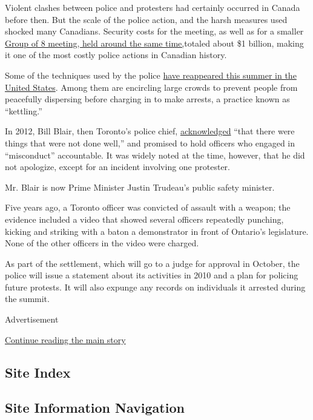 Violent clashes between police and protesters had certainly occurred in
Canada before then. But the scale of the police action, and the harsh
measures used shocked many Canadians. Security costs for the meeting, as
well as for a smaller
\href{https://www.nytimes3xbfgragh.onion/2010/06/25/world/americas/25canada.html}{Group
of 8 meeting, held around the same time,}totaled about \$1 billion,
making it one of the most costly police actions in Canadian history.

Some of the techniques used by the police
\href{https://www.nytimes3xbfgragh.onion/2020/06/05/nyregion/police-kettling-protests-nyc.html}{have
reappeared this summer in the United States}. Among them are encircling
large crowds to prevent people from peacefully dispersing before
charging in to make arrests, a practice known as ``kettling.''

In 2012, Bill Blair, then Toronto's police chief,
\href{https://www.cbc.ca/toronto/news/blair-release-051912.html}{acknowledged}
``that there were things that were not done well,'' and promised to hold
officers who engaged in ``misconduct'' accountable. It was widely noted
at the time, however, that he did not apologize, except for an incident
involving one protester.

Mr. Blair is now Prime Minister Justin Trudeau's public safety minister.

Five years ago, a Toronto officer was convicted of assault with a
weapon; the evidence included a video that showed several officers
repeatedly punching, kicking and striking with a baton a demonstrator in
front of Ontario's legislature. None of the other officers in the video
were charged.

As part of the settlement, which will go to a judge for approval in
October, the police will issue a statement about its activities in 2010
and a plan for policing future protests. It will also expunge any
records on individuals it arrested during the summit.

Advertisement

\protect\hyperlink{after-bottom}{Continue reading the main story}

\hypertarget{site-index}{%
\subsection{Site Index}\label{site-index}}

\hypertarget{site-information-navigation}{%
\subsection{Site Information
Navigation}\label{site-information-navigation}}


